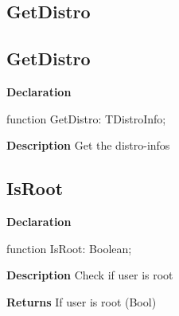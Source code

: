 \documentclass{report}
\newif\ifpdf
\begin{document}
\subsection*{\large{\textbf{GetDistro}}\normalsize\hspace{1ex}\hrulefill}
\else
\subsection*{GetDistro}
\fi
\label{distri-GetDistro}
\begin{list}{}{
\setlength{\itemindent}{0cm}
\setlength{\listparindent}{0cm}
\setlength{\leftmargin}{\evensidemargin}
\addtolength{\leftmargin}{\tmplength}
\settowidth{\labelsep}{X}
\addtolength{\leftmargin}{\labelsep}
\setlength{\labelwidth}{\tmplength}
}
\item[\textbf{Declaration}\hfill]
\ifpdf
\begin{flushleft}
\fi
\begin{ttfamily}
function GetDistro: TDistroInfo;\end{ttfamily}

\ifpdf
\end{flushleft}
\fi

\par
\item[\textbf{Description}]
Get the distro{-}infos

\end{list}
\ifpdf
\subsection*{\large{\textbf{IsRoot}}\normalsize\hspace{1ex}\hrulefill}
\else
\subsection*{IsRoot}
\fi
\label{distri-IsRoot}
\begin{list}{}{
\setlength{\itemindent}{0cm}
\setlength{\listparindent}{0cm}
\setlength{\leftmargin}{\evensidemargin}
\addtolength{\leftmargin}{\tmplength}
\settowidth{\labelsep}{X}
\addtolength{\leftmargin}{\labelsep}
\setlength{\labelwidth}{\tmplength}
}
\item[\textbf{Declaration}\hfill]
\ifpdf
\begin{flushleft}
\fi
\begin{ttfamily}
function IsRoot: Boolean;\end{ttfamily}

\ifpdf
\end{flushleft}
\fi

\par
\item[\textbf{Description}]
Check if user is root \par
\item[\textbf{Returns}]If user is root (Bool)


\end{list}
\ifpdf
\end{document}
